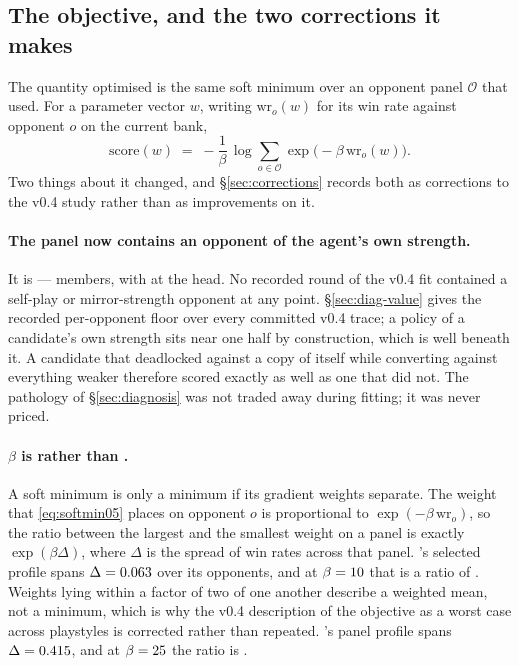 \subsection{The objective, and the two corrections it makes}
\label{sec:fit-objective}

The quantity optimised is the same soft minimum over an opponent panel
$\mathcal{O}$ that \vfour{} used. For a parameter vector $w$, writing
$\mathrm{wr}_o(w)$ for its win rate against opponent $o$ on the current bank,
\begin{equation}
  \mathrm{score}(w) \;=\; -\frac{1}{\beta}\,
    \log \sum_{o \in \mathcal{O}} \exp\bigl(-\beta\,\mathrm{wr}_o(w)\bigr).
  \label{eq:softmin05}
\end{equation}
Two things about it changed, and \S\ref{sec:corrections} records both as
corrections to the v0.4 study rather than as improvements on it.

\paragraph{The panel now contains an opponent of the agent's own strength.} It is
\numFitPanel{} --- \numFitPanelN{} members, with \vfour{} at the head. No
recorded round of the v0.4 fit contained a self-play or mirror-strength opponent
at any point. \S\ref{sec:diag-value} gives the recorded per-opponent floor over
every committed v0.4 trace; a policy of a candidate's own strength sits near one
half by construction, which is well beneath it. A candidate that
deadlocked against a copy of itself while converting against everything weaker
therefore scored exactly as well as one that did not. The pathology of
\S\ref{sec:diagnosis} was not traded away during fitting; it was never priced.

\paragraph{$\beta$ is \numFitBeta{} rather than \numSoftMinBeta{}.} A soft
minimum is only a minimum if its gradient weights separate. The weight that
\eqref{eq:softmin05} places on opponent $o$ is proportional to
$\exp(-\beta\,\mathrm{wr}_o)$, so the ratio between the largest and the smallest
weight on a panel is exactly $\exp(\beta\Delta)$, where $\Delta$ is the spread of
win rates across that panel. \vfour{}'s selected profile spans
$\Delta = 0.063$ over its \numSoftMinPanelN{} opponents, and at
$\beta = 10$ that is a ratio of \numSoftMinRatio{}. Weights lying
within a factor of two of one another describe a weighted mean, not a minimum,
which is why the v0.4 description of the objective as a worst case across
playstyles is corrected rather than repeated. \vfive{}'s panel profile spans
$\Delta = 0.415$, and at $\beta = 25$ the ratio is
\numFitRatio{}.

